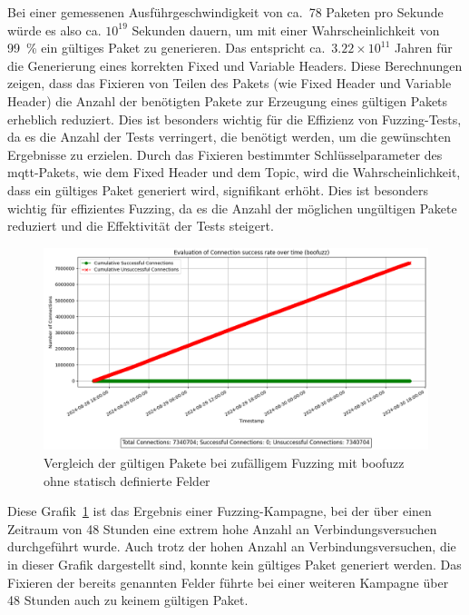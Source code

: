 Bei einer gemessenen Ausführgeschwindigkeit von ca.\ 78 Paketen pro Sekunde würde es also ca. $10^{19}$ Sekunden dauern, um
mit einer Wahrscheinlichkeit von \SI{99}{\percent} ein gültiges Paket zu generieren.
Das entspricht ca.\ $3.22 \times 10^{11}$ Jahren für die Generierung eines korrekten Fixed und Variable Headers.\newline
Diese Berechnungen zeigen, dass das Fixieren von Teilen des Pakets (wie Fixed Header und Variable Header) die
Anzahl der benötigten Pakete zur Erzeugung eines gültigen Pakets erheblich reduziert.
Dies ist besonders wichtig für die Effizienz von Fuzzing-Tests, da es die Anzahl der Tests verringert, die benötigt werden,
um die gewünschten Ergebnisse zu erzielen.
\newline\newline
Durch das Fixieren bestimmter Schlüsselparameter des \gls{mqtt}-Pakets, wie dem Fixed Header und dem Topic, wird die Wahrscheinlichkeit,
dass ein gültiges Paket generiert wird, signifikant erhöht.
Dies ist besonders wichtig für effizientes Fuzzing, da es die Anzahl der möglichen ungültigen Pakete reduziert und die Effektivität der Tests steigert.
\begin{figure}[H]
    \centering
    \includegraphics[width=\textwidth]{img/connection_evaluation_boofuzz}
    \caption{Vergleich der gültigen Pakete bei zufälligem Fuzzing mit boofuzz ohne statisch definierte Felder}
    \label{fig:valid_packets}
\end{figure}
\noindent Diese Grafik~\ref{fig:valid_packets} ist das Ergebnis einer Fuzzing-Kampagne, bei der über einen Zeitraum von 48 Stunden eine extrem hohe Anzahl an Verbindungsversuchen durchgeführt wurde.
Auch trotz der hohen Anzahl an Verbindungsversuchen, die in dieser Grafik dargestellt sind, konnte kein gültiges Paket generiert werden.
Das Fixieren der bereits genannten Felder führte bei einer weiteren Kampagne über 48 Stunden auch zu keinem gültigen Paket.
